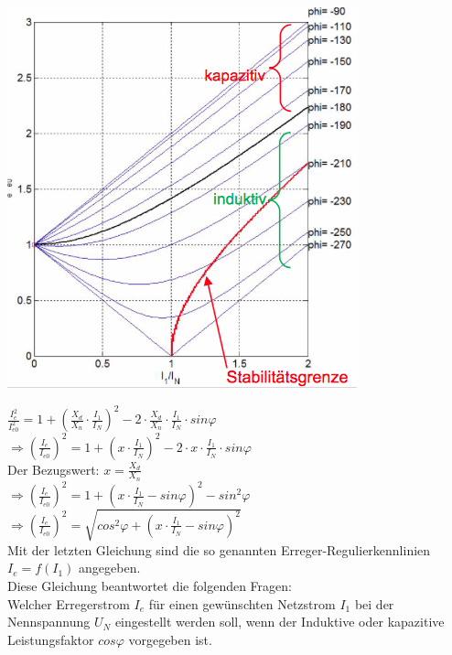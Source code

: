 \begin{minipage}{0.25 \linewidth}
\includegraphics[width =  \linewidth]{./Pics/VL1011/regulierkennlinie}
\end{minipage}
\begin{minipage}{0.75 \linewidth}
$\frac{I_e^2}{I_{e0}^2} = 1 + (\frac{X_d}{X_n} \cdot \frac{I_1}{I_N})^2 - 2 \cdot \frac{X_d}{X_n} \cdot \frac{I_1}{I_N} \cdot sin\varphi$\\

$\Rightarrow (\frac{I_e}{I_{e0}})^2 = 1 + (x \cdot \frac{I_1}{I_N})^2 - 2 \cdot x \cdot \frac{I_1}{I_N} \cdot sin\varphi$ \\

Der Bezugswert: $x=\frac{X_d}{X_n}$ \\

$\Rightarrow (\frac{I_e}{I_{e0}})^2 = 1 + (x \cdot \frac{I_1}{I_N} - sin\varphi)^2 - sin^2\varphi$ \\

$\Rightarrow (\frac{I_e}{I_{e0}})^2 = \sqrt{cos^2\varphi + (x \cdot \frac{I_1}{I_N} - sin\varphi)^2}$ \\

Mit der letzten Gleichung sind die so genannten Erreger-Regulierkennlinien $I_e = f(I_1)$ angegeben. \\

Diese Gleichung beantwortet die folgenden Fragen: \\
Welcher Erregerstrom $I_e$ für einen gewünschten Netzstrom $I_1$ bei der Nennspannung $U_N$ eingestellt werden soll, wenn der Induktive oder kapazitive Leistungsfaktor $cos \varphi$ vorgegeben ist. 
\end{minipage}

